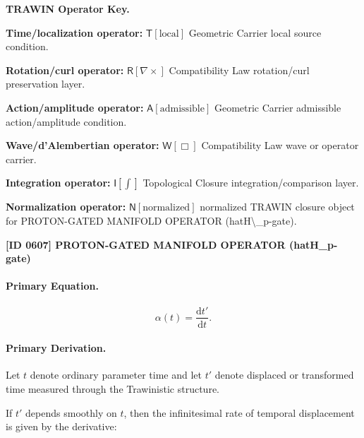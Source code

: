 \par\vspace{0.45\baselineskip}
\noindent\begin{minipage}[t]{\linewidth}
\begingroup
\small
\raggedright
\textbf{TRAWIN Operator Key.}\par
\noindent\textbf{Time/localization operator:} $\mathsf{T}\!\left[\mathrm{local}\right]$ Geometric Carrier local source condition.\par
\noindent\textbf{Rotation/curl operator:} $\mathsf{R}\!\left[\nabla\times\right]$ Compatibility Law rotation/curl preservation layer.\par
\noindent\textbf{Action/amplitude operator:} $\mathsf{A}\!\left[\mathrm{admissible}\right]$ Geometric Carrier admissible action/amplitude condition.\par
\noindent\textbf{Wave/d'Alembertian operator:} $\mathsf{W}\!\left[\Box\right]$ Compatibility Law wave or operator carrier.\par
\noindent\textbf{Integration operator:} $\mathsf{I}\!\left[\int\right]$ Topological Closure integration/comparison layer.\par
\noindent\textbf{Normalization operator:} $\mathsf{N}\!\left[\mathrm{normalized}\right]$ normalized TRAWIN closure object for PROTON-GATED MANIFOLD OPERATOR (hatH\textbackslash{}\_p-gate).\par
\endgroup
\end{minipage}

\clearpage
\noindent\textbf{[ID 0607] PROTON-GATED MANIFOLD OPERATOR (hatH\_p-gate)}\par
\vspace{0.35em}
\paragraph{Primary Equation.}
\begin{equation}
\alpha(t)=\frac{\mathrm{d}t'}{\mathrm{d}t}.
\end{equation}

\paragraph{Primary Derivation.}
Let $t$ denote ordinary parameter time and let $t'$ denote displaced or transformed time measured through the Trawinistic structure.

If $t'$ depends smoothly on $t$, then the infinitesimal rate of temporal displacement is given by the derivative:

